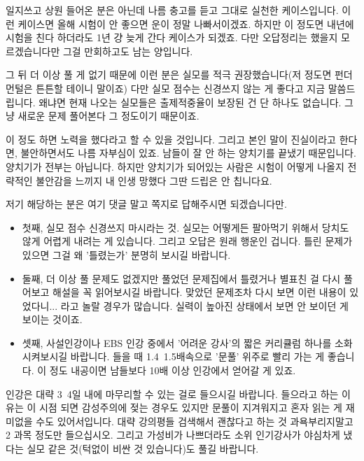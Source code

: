 일지쓰고 상원 들어온 분은 아닌데 나름 충고를 듣고 그대로 실천한 케이스입니다.
이런 케이스면 올해 시험이 안 좋으면 운이 정말 나빠서이겠죠. 하지만 이 정도면 내년에 시험을 친다 하더라도 1년 걍 늦게 간다 케이스가 되겠죠.
다만 오답정리는 했을지 모르겠습니다만 그걸 만회하고도 남는 양입니다.
\vspace{5mm}

그 뒤 더 이상 풀 게 없기 때문에 이런 분은 실모를 적극 권장했습니다(저 정도면 펀더먼털은 튼튼할 테이니 말이죠)
다만 실모 점수는 신경쓰지 않는 게 좋다고 지금 말씀드립니다. 왜냐면 현재 나오는 실모들은 출제적중율이 보장된 건 단 하나도 없습니다.
그냥 새로운 문제 풀어본다 그 정도이기 때문이죠.
\vspace{5mm}

이 정도 하면 노력을 했다라고 할 수 있을 것입니다.
그리고 본인 말이 진실이라고 한다면, 불안하면서도 나름 자부심이 있죠. 남들이 잘 안 하는 양치기를 끝냈기 때문입니다.
양치기가 전부는 아닙니다. 하지만 양치기가 되어있는 사람은 시험이 어떻게 나올지 전략적인 불안감을 느끼지
내 인생 망했다 그딴 드립은 안 칩니다요.
\vspace{5mm}

저기 해당하는 분은 여기 댓글 말고 쪽지로 답해주시면 되겠습니다만.
\vspace{5mm}
\begin{itemize}
    \item 첫째, 실모 점수 신경쓰지 마시라는 것. 실모는 어떻게든 팔아먹기 위해서 당치도 않게 어렵게 내려는 게 있습니다.
    그리고 오답은 원래 행운인 겁니다. 틀린 문제가 있으면 그걸 왜 '틀렸는가' 분명히 보시길 바랍니다.
    \item 둘째, 더 이상 풀 문제도 없겠지만 풀었던 문제집에서 틀렸거나 별표친 걸 다시 풀어보고 해설을 꼭 읽어보시길 바랍니다.
    맞았던 문제조차 다시 보면 이런 내용이 있었다니... 라고 놀랄 경우가 많습니다. 실력이 높아진 상태에서 보면 안 보이던 게 보이는 것이죠.
    \item 셋째, 사설인강이나 EBS 인강 중에서 '어려운 강사'의 짧은 커리큘럼 하나를 소화시켜보시길 바랍니다.
    들을 때 1.4~1.5배속으로 '문풀' 위주로 빨리 가는 게 좋습니다. 이 정도 내공이면 남들보다 10배 이상 인강에서 얻어갈 게 있죠.
\end{itemize}
\vspace{5mm}

인강은 대략 3~4일 내에 마무리할 수 있는 걸로 들으시길 바랍니다.
들으라고 하는 이유는 이 시점 되면 감성주의에 젖는 경우도 있지만 문풀이 지겨워지고 혼자 읽는 게 재미없을 수도 있어서입니다.
대략 강의평들 검색해서 괜찮다고 하는 것 과욕부리지말고 2 과목 정도만 들으십시오.
그리고 가성비가 나쁘더라도 소위 인기강사가 야심차게 냈다는 실모 같은 것(턱없이 비싼 것 있습니다)도 풀길 바랍니다.
\vspace{5mm}

